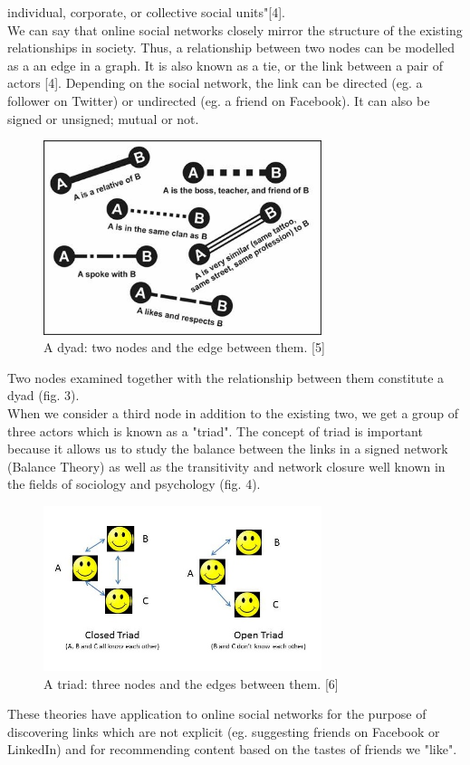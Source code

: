 \documentclass[conference,letterpaper]{IEEEtran}
\begin{document}
individual, corporate, or collective social units"[4]. \\
We can say that online social networks closely mirror the structure of the existing relationships in society.
Thus, a relationship between two nodes can be modelled as a an edge in a graph. It is also known as a tie, or
the link between a pair of actors [4]. Depending on the social network, the link can be directed (eg. a follower
on Twitter) or undirected (eg. a friend on Facebook). It can also be signed or unsigned; mutual or not. \\
\begin{center}
\begin{figure}[hb]
\centering
\includegraphics[width=3.2in]{f03}
\caption{
A dyad: two nodes and the edge between them. [5]
}
\label{fig_sim3}
\end{figure}
\end{center}
Two nodes examined together with the relationship between them constitute a dyad (fig. 3). \\
When we consider a third node in addition to the existing two, we get a group of three actors which is known 
as a "triad". The concept of triad is important because it allows us to study the balance between the links in a
signed network (Balance Theory) as well as the transitivity and network closure well known in the fields of
sociology and psychology (fig. 4).\\
\begin{center}
\begin{figure}[hb]
\centering
\includegraphics[width=3.2in]{open-triad}
\caption{
A triad: three nodes and the edges between them. [6]
}
\label{fig_sim4}
\end{figure}
\end{center}
These theories have application to online social networks for the purpose of discovering links which are not
explicit (eg. suggesting friends on Facebook or LinkedIn) and for recommending content based on the tastes of friends we "like".\\
\end{document}
